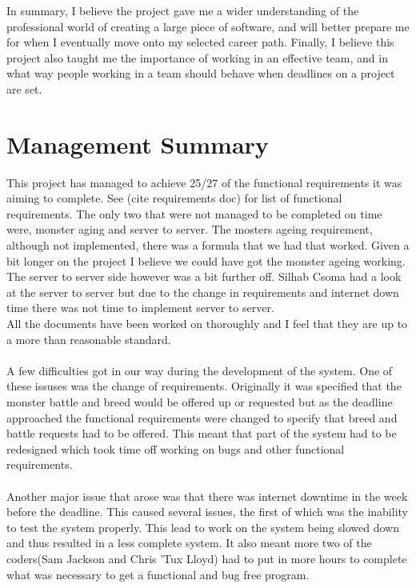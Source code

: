 \documentclass{project}
\begin{document}
In summary, I believe the project gave me a wider understanding of the professional world of creating a large piece of software, and will better prepare me for when I eventually move onto my selected career path. Finally, I believe this project also taught me the importance of working in an effective team, and in what way people working in a team should behave when deadlines on a project are set.   
\\


\section{Management Summary}
This project has managed to achieve 25/27 of the functional requirements it was aiming to complete. See (cite requirements doc) for list of functional requirements. The only two that were not managed to be completed on time were, monster aging and server to server. The mosters ageing requirement, although not implemented, there was a formula that we had that worked. Given a bit longer on the project I believe we could have got the monster ageing working. The server to server side however was a bit further off. Silhab Csoma had a look at the server to server but due to the change in requirements and internet down time there was not time to implement server to server.
\\
All the documents have been worked on thoroughly and I feel that they are up to a more than reasonable standard.
\\
\\
A few difficulties got in our way during the development of the system. One of these issuses was the change of requirements. Originally it was specified that the monster battle and breed would be offered up or requested but as the deadline approached the functional requirements were changed to specify that breed and battle requests had to be offered. This meant that part of the system had to be redesigned which took time off working on bugs and other functional requirements. 
\\
\\
Another major issue that arose was that there was internet downtime in the week before the deadline. This caused several issues, the first of which was the inability to test the system properly. This lead to work on the system being slowed down and thus resulted in a less complete system. It also meant more two of the coders(Sam Jackson and Chris 'Tux Lloyd) had to put in more hours to complete what was necessary to get a functional and bug free program. 
\end{document}
